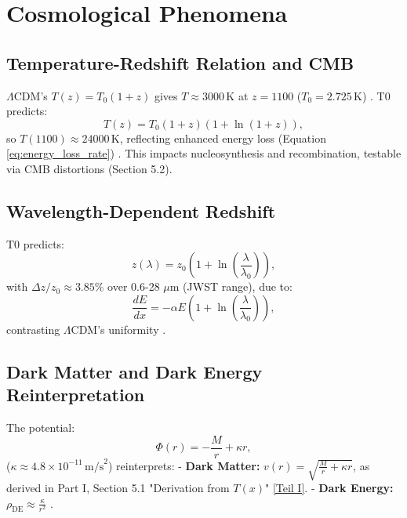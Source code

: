 \documentclass[twocolumn,aps,prl]{revtex4-2}
\newcommand{\Tfield}{T(x)}
\newcommand{\LCDM}{\Lambda\text{CDM}}
\begin{document}
	\section{Cosmological Phenomena}
	\label{sec:cosmological_phenomena}
	
	\subsection{Temperature-Redshift Relation and CMB}
	\label{subsec:cmb_temp}
	
	\(\LCDM\)’s \(T(z) = T_0 (1 + z)\) gives \(T \approx 3000 \, \text{K}\) at \(z = 1100\) (\(T_0 = 2.725 \, \text{K}\)) \cite{Fixsen2009}. T0 predicts:
	\begin{equation}
		T(z) = T_0 (1 + z) (1 + \ln(1 + z)),
		\label{eq:temperature_redshift_simplified}
	\end{equation}
	so \(T(1100) \approx 24000 \, \text{K}\), reflecting enhanced energy loss (Equation \ref{eq:energy_loss_rate}) \cite{pascher_temp_2025}. This impacts nucleosynthesis and recombination, testable via CMB distortions (Section 5.2).
	
	\subsection{Wavelength-Dependent Redshift}
	\label{subsec:wavelength_redshift}
	
	T0 predicts:
	\begin{equation}
		z(\lambda) = z_0 \left(1 + \ln\left(\frac{\lambda}{\lambda_0}\right)\right),
		\label{eq:wavelength_redshift}
	\end{equation}
	with \(\Delta z / z_0 \approx 3.85\%\) over 0.6-28 \(\mu\text{m}\) (JWST range), due to:
	\begin{equation}
		\frac{dE}{dx} = -\alpha E \left(1 + \ln\left(\frac{\lambda}{\lambda_0}\right)\right),
		\label{eq:wavelength_energy_loss}
	\end{equation}
	contrasting \(\LCDM\)’s uniformity \cite{pascher_params_2025}.
	
	\subsection{Dark Matter and Dark Energy Reinterpretation}
	\label{subsec:dark_reinterpretation}
	
	The potential:
	\begin{equation}
		\Phi(r) = -\frac{M}{r} + \kappa r,
		\label{eq:grav_potential_t0}
	\end{equation}
	(\(\kappa \approx 4.8 \times 10^{-11} \, \text{m/s}^2\)) reinterprets:
	- \textbf{Dark Matter:} \(v(r) = \sqrt{\frac{M}{r} + \kappa r}\), as derived in Part I, Section 5.1 "Derivation from \(\Tfield\)" \href{https://github.com/jpascher/T0-Time-Mass-Duality/tree/main/2/pdf/English/QMRelTimeMassPart1En.pdf}{[Teil I]}.
	- \textbf{Dark Energy:} \(\rho_{\text{DE}} \approx \frac{\kappa}{r^2}\) \cite{pascher_galaxies_2025}.
	
\end{document}
